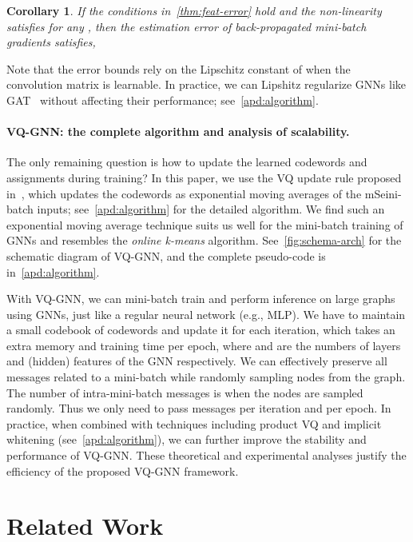 \documentclass{article}
\newtheorem{corollary}[theorem]{Corollary}
\newcommand{\cm}{\paragraph}
\renewcommand{\emph}[1]{\textit{#1}}
\begin{document}
\begin{corollary}
\label{coro:grad-error}
If the conditions in~\cref{thm:feat-error} hold and the non-linearity satisfies  for any , then the estimation error of back-propagated mini-batch gradients satisfies,

\end{corollary}
Note that the error bounds rely on the Lipschitz constant of  when the convolution matrix is learnable. In practice, we can Lipshitz regularize GNNs like GAT~\citep{velivckovic2017graph} without affecting their performance; see~\cref{apd:algorithm}.



\cm{VQ-GNN: the complete algorithm and analysis of scalability.}
The only remaining question is how to update the learned codewords and assignments during training? In this paper, we use the VQ update rule proposed in~\citep{oord2017neural}, which updates the codewords as exponential moving averages of the mSeini-batch inputs; see~\cref{apd:algorithm} for the detailed algorithm. We find such an exponential moving average technique suits us well for the mini-batch training of GNNs and resembles the \emph{online k-means} algorithm. See~\cref{fig:schema-arch} for the schematic diagram of VQ-GNN, and the complete pseudo-code is in~\cref{apd:algorithm}. 

With VQ-GNN, we can mini-batch train and perform inference on large graphs using GNNs, just like a regular neural network (e.g., MLP). We have to maintain a small codebook of  codewords and update it for each iteration, which takes an extra  memory and  training time per epoch, where  and  are the numbers of layers and (hidden) features of the GNN respectively. We can effectively preserve all messages related to a mini-batch while randomly sampling nodes from the graph. The number of intra-mini-batch messages is  when the nodes are sampled randomly. Thus we only need to pass  messages per iteration and  per epoch. In practice, when combined with techniques including product VQ  and implicit whitening (see~\cref{apd:algorithm}), we can further improve the stability and performance of VQ-GNN. These theoretical and experimental analyses justify the efficiency of the proposed VQ-GNN framework.

%
 \section{Related Work}
\label{sec:related}
\end{document}
